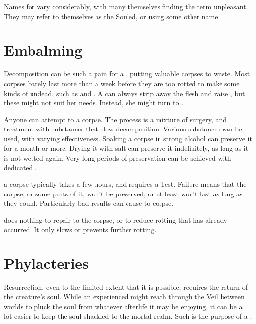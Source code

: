 Names for  vary considerably, with many  themselves finding the term unpleasant.
They may refer to themselves as the Souled, or using some other name.

\section{Embalming}

Decomposition can be such a pain for a , putting valuable corpses to waste.
Most corpses barely last more than a week before they are too rotted to make some kinds of undead, such as  and .
A  can always strip away the flesh and raise , but these might not suit her needs.
Instead, she might turn to {\embalming}.

Anyone can attempt to {\embalm} a corpse.
The process is a mixture of surgery, and treatment with substances that slow decomposition.
Various substances can be used, with varying effectiveness.
Soaking a corpse in strong alcohol can preserve it for a month or more.
Drying it with salt can preserve it indefinitely, as long as it is not wetted again.
Very long periods of preservation can be achieved with dedicated .

{\embalming} a corpse typically takes a few hours, and requires a  Test.
Failure means that the corpse, or some parts of it, won't be preserved, or at least won't last as long as they could.
Particularly bad results can cause {\damage} to corpse.

{\embalming} does nothing to repair {\damage} to the corpse, or to reduce rotting that has already occurred.
It only slows or prevents further rotting.

\section{Phylacteries}

Resurrection, even to the limited extent that it is possible, requires the return of the creature's soul.
While an experienced  might reach through the Veil between worlds to pluck the soul from whatever afterlife it may be enjoying, it can be a lot easier to keep the soul shackled to the mortal realm.
Such is the purpose of a {\phylactery}.

